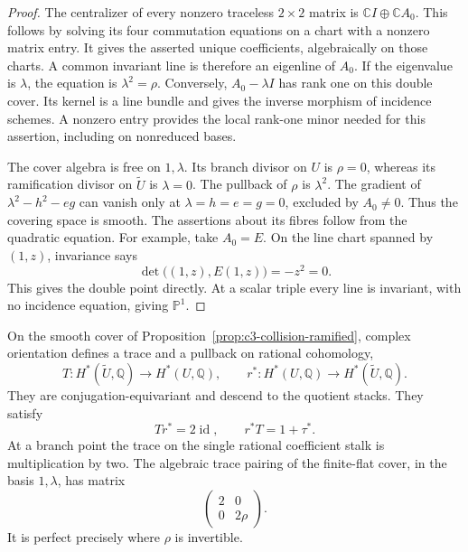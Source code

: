 \begin{proof}
The centralizer of every nonzero traceless $2\times2$ matrix is
$\mathbb CI\oplus\mathbb CA_0$. This follows by solving its four
commutation equations on a chart with a nonzero matrix entry.
It gives the asserted unique coefficients, algebraically on those
charts. A common invariant line is therefore an eigenline of $A_0$.
If the eigenvalue is $\lambda$, the equation is $\lambda^2=\rho$.
Conversely, $A_0-\lambda I$ has rank one on this double cover.
Its kernel is a line bundle and gives the inverse morphism of
incidence schemes. A nonzero entry provides the local rank-one
minor needed for this assertion, including on nonreduced bases.

The cover algebra is free on $1,\lambda$. Its branch divisor on $U$
is $\rho=0$, whereas its ramification divisor on $\widetilde U$
is $\lambda=0$. The pullback of $\rho$ is $\lambda^2$.
The gradient of $\lambda^2-h^2-eg$ can vanish only
at $\lambda=h=e=g=0$, excluded by $A_0\ne0$. Thus the covering
space is smooth. The assertions about its fibres follow from the
quadratic equation.
For example, take $A_0=E$. On the line chart spanned by $(1,z)$,
invariance says
\[
 \det\bigl((1,z),E(1,z)\bigr)=-z^2=0.
\]
This gives the double point directly. At a scalar triple every
line is invariant, with no incidence equation, giving $\mathbb P^1$.
\end{proof}

\begin{proposition}
\label{prop:c3-collision-transfer}
On the smooth cover of Proposition~\ref{prop:c3-collision-ramified}, complex
orientation defines a trace and a pullback on rational cohomology,
\[
 T:H^*(\widetilde U,\mathbb Q)\longrightarrow H^*(U,\mathbb Q),
 \qquad r^*:H^*(U,\mathbb Q)\longrightarrow H^*(\widetilde U,\mathbb Q).
\]
They are conjugation-equivariant and descend to the quotient stacks.
They satisfy
\[
 Tr^*=2\operatorname{id},\qquad r^*T=1+\tau^*.
\]
At a branch point the trace on the single rational coefficient
stalk is multiplication by two. The algebraic trace pairing of
the finite-flat cover, in the basis $1,\lambda$, has matrix
\[
 \begin{pmatrix}2&0\\0&2\rho\end{pmatrix}.
\]
It is perfect precisely where $\rho$ is invertible.
\end{proposition}

